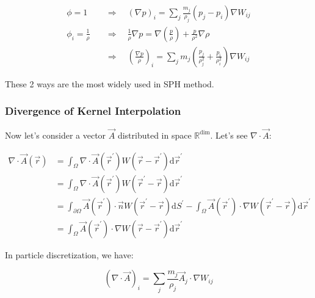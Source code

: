 \documentclass[10pt, oneside]{article}
\begin{document}
\begin{equation}
    \begin{aligned}
        \phi = 1 \quad &\Rightarrow \quad 
            (\nabla p)_i = \sum_j \frac{m_j}{\rho_j} (p_j-p_i) \nabla W_{ij} \\
        \phi_i = \frac{1}{\rho} \quad &\Rightarrow \quad 
            \frac{1}{\rho}\nabla p = \nabla \left(
                \frac{p}{\rho}
            \right)+
            \frac{p}{\rho^2}\nabla \rho\\
            &\Rightarrow\quad
            \left(\frac{\nabla p}{\rho}\right)_i=
            \sum_j m_j \left(
                \frac{p_j}{\rho_j^2}+\frac{p_i}{\rho_i^2}
            \right) \nabla W_{ij}
    \end{aligned}
\end{equation}

These 2 ways are the most widely used in SPH method.

\subsubsection{Divergence of Kernel Interpolation}

Now let's consider a vector $\vec{A}$ distributed in space $\mathbb{R}^\text{dim}$.
Let's see $\nabla\cdot\vec{A}$:

\begin{equation}
    \begin{aligned}
        \nabla\cdot\vec{A}(\vec{r}) &= \int_{\Omega} \nabla\cdot\vec{A}(\vec{r}^\prime) W(\vec{r} - \vec{r}^\prime) \mathrm{d}\vec{r}^\prime \\
        &= \int_{\Omega} \nabla\cdot\vec{A}(\vec{r}^\prime) W(\vec{r}^\prime - \vec{r}) \mathrm{d}\vec{r}^\prime \\
        &= \int_{\partial \Omega} \vec{A}(\vec{r}^\prime) \cdot \vec{n} W(\vec{r}^\prime - \vec{r}) \mathrm{d}S^\prime -
        \int_{\Omega} \vec{A}(\vec{r}^\prime) \cdot \nabla W(\vec{r}^\prime - \vec{r}) \mathrm{d}\vec{r}^\prime\\
        &= \int_{\Omega} \vec{A}(\vec{r}^\prime) \cdot \nabla W(\vec{r} - \vec{r}^\prime) \mathrm{d}\vec{r}^\prime
    \end{aligned}
\end{equation}

In particle discretization, we have:

\begin{equation}
    (\nabla\cdot\vec{A})_i = \sum_{j} \frac{m_j}{\rho_j} \vec{A}_j \cdot \nabla W_{ij}
\end{equation}
\end{document}
